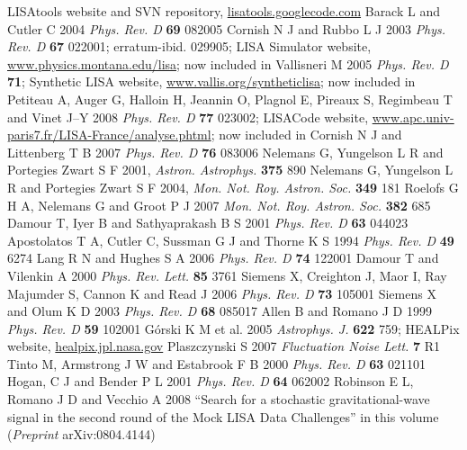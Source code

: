 \documentclass{iopart}
\begin{document}
\begin{thebibliography}{99}
%
 LISAtools website and SVN repository, \url{lisatools.googlecode.com}
%
 Barack L and Cutler C 2004 \textit{Phys. Rev. D} \textbf{69} 082005
%
 Cornish N J and Rubbo L J 2003 \emph{Phys. Rev. D} \textbf{67} 022001; erratum-ibid. 029905; LISA Simulator website, \url{www.physics.montana.edu/lisa}; now included in \cite{lisatools}
%
 Vallisneri M 2005 \emph{Phys. Rev. D} \textbf{71}; Synthetic LISA website, \url{www.vallis.org/syntheticlisa}; now included in \cite{lisatools}
%
 Petiteau A, Auger G, Halloin H, Jeannin O, Plagnol E, Pireaux S, Regimbeau T and Vinet J--Y 2008 \emph{Phys. Rev. D} \textbf{77} 023002; LISACode website, \url{www.apc.univ-paris7.fr/LISA-France/analyse.phtml}; now included in \cite{lisatools}
%
 Cornish N J and Littenberg T B 2007 \textit{Phys. Rev. D} \textbf{76} 083006
%
 Nelemans G, Yungelson L R and Portegies Zwart S F 2001, \textit{Astron. Astrophys.} \textbf{375} 890
%
 Nelemans G, Yungelson L R and Portegies Zwart S F 2004, \emph{Mon. Not. Roy. Astron. Soc.} {\bf 349} 181
%
 Roelofs G H A, Nelemans G and Groot P J 2007
\emph{Mon. Not. Roy. Astron. Soc.} {\bf 382} 685
%
 Damour T, Iyer B and Sathyaprakash B S 2001 \textit{Phys. Rev. D} {\bf 63} 044023
%
 Apostolatos T A, Cutler C, Sussman G J and Thorne K S 1994 \textit{Phys. Rev. D} \textbf{49} 6274
%
 Lang R N and Hughes S A 2006 \textit{Phys. Rev. D} {\bf 74} 122001
%
%
 Damour T and Vilenkin A 2000 \textit{Phys. Rev. Lett.} {\bf 85} 3761
%
 Siemens X, Creighton J, Maor I, Ray Majumder S,
Cannon K and Read J 2006 \textit{Phys. Rev. D} {\bf 73} 105001
%
 Siemens X and Olum K D 2003 \textit{Phys. Rev. D} {\bf 68} 085017
%
 Allen B and Romano J D 1999 \textit{Phys. Rev. D} {\bf 59} 102001
%
 G\'orski K M et al. 2005 \textit{Astrophys. J.} {\bf 622} 759; HEALPix website, \url{healpix.jpl.nasa.gov}
%
 Plaszczynski S 2007 \textit{Fluctuation Noise Lett.} {\bf 7} R1
%
 Tinto M, Armstrong J W and Estabrook F B 2000 \textit{Phys. Rev. D} \textbf{63} 021101
%
 Hogan, C J and Bender P L 2001 \textit{Phys. Rev. D} \textbf{64} 062002 
%
 Robinson E L, Romano J D and Vecchio A 2008 ``Search for a stochastic gravitational-wave signal in the second round of the Mock LISA Data Challenges'' in this volume (\textit{Preprint} arXiv:0804.4144)
%
\end{thebibliography}
\end{document}
